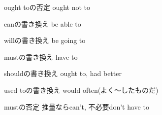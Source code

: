 \documentclass[10pt]{jsarticle}
\newcommand{\answer}[2]{{\color{orange}#2}}
\newcommand{\page}[1]{#1}
\newcommand{\question}[2]{{\color{orange}#2}}
\newcommand{\answer}[2]{\vspace{#1mm}}
\newcommand{\page}[1]{}
\newcommand{\question}[2]{#1}
\begin{document}
\begin{itembox}[l]{ought toの否定}
	\answer{10}{ought not to}
\end{itembox}


\begin{multicols}{2}
	\begin{itembox}[l]{canの書き換え}
		\answer{8}{be able to}
	\end{itembox}
	\begin{itembox}[l]{willの書き換え}
		\answer{8}{be going to}
	\end{itembox}
	\begin{itembox}[l]{mustの書き換え}
		\answer{8}{have to}
	\end{itembox}
	\begin{itembox}[l]{shouldの書き換え}
		\answer{8}{ought to, had better}
	\end{itembox}
	\begin{itembox}[l]{used toの書き換え}
		\answer{8}{would often(よく〜したものだ)}
	\end{itembox}
	\begin{itembox}[l]{mustの否定}
		\answer{8}{推量ならcan't, 不必要don't have to}
	\end{itembox}

\end{multicols}

\question{
	\begin{itembox}[l]{過去の表現方法の違い}
		\vspace{2cm}
	\end{itembox}
}{}

\page{}
\question{\section{助動詞 日本語$\rightarrow$英語}}{\stepcounter{section}}
\end{document}
